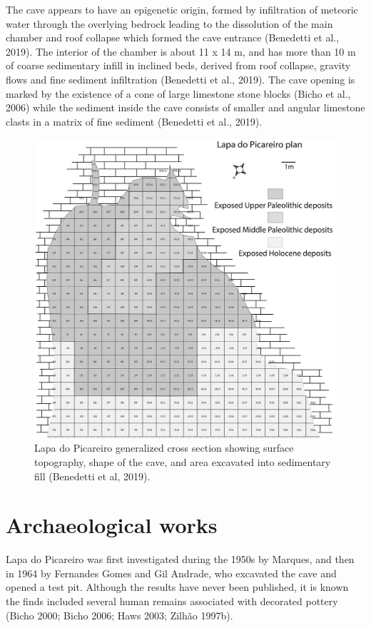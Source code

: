 \documentclass[12pt,twoside]{reedthesis}
\begin{document}
The cave appears to have an epigenetic origin, formed by infiltration of meteoric water through the overlying bedrock leading to the dissolution of the main chamber and roof collapse which formed the cave entrance (Benedetti et al., 2019). The interior of the chamber is about 11 x 14 m, and has more than 10 m of coarse sedimentary infill in inclined beds, derived from roof collapse, gravity flows and fine sediment infiltration (Benedetti et al., 2019). The cave opening is marked by the existence of a cone of large limestone stone blocks (Bicho et al., 2006) while the sediment inside the cave consists of smaller and angular limestone clasts in a matrix of fine sediment (Benedetti et al., 2019).
\begin{figure}
\includegraphics[width=1\linewidth]{figure/LP_units} \caption{Lapa do Picareiro generalized cross section showing surface topography, shape of the cave, and area excavated into sedimentary fill (Benedetti et al, 2019).}\label{fig:unnamed-chunk-6}
\end{figure}
\hypertarget{archaeological-works-1}{%
\section{Archaeological works}\label{archaeological-works-1}}

Lapa do Picareiro was first investigated during the 1950s by Marques, and then in 1964 by Fernandes Gomes and Gil Andrade, who excavated the cave and opened a test pit. Although the results have never been published, it is known the finds included several human remains associated with decorated pottery (Bicho 2000; Bicho 2006; Haws 2003; Zilhão 1997b).
\end{document}
